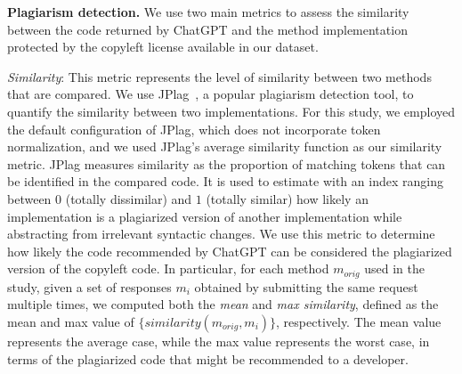 
\textbf{Plagiarism detection.} %
We use two main metrics to assess the similarity between the code returned by ChatGPT and the method implementation protected by the copyleft license available in our dataset.

    \emph{Similarity}: This metric represents the level of similarity between two methods that are compared. We use  JPlag~\cite{jplag}, a popular plagiarism detection tool, to quantify the similarity between two implementations. For this study, we employed the default configuration of JPlag, which does not incorporate token normalization, and we used JPlag's average similarity function as our similarity metric. JPlag measures similarity as the proportion of matching tokens that can be identified in the compared code. It is used to estimate with an index ranging between $0$ (totally dissimilar) and $1$ (totally similar) how likely an implementation is a plagiarized version of another implementation while abstracting from irrelevant syntactic changes. We use this metric to determine how likely the code recommended by ChatGPT can be considered the plagiarized version of the copyleft code.  In particular, for each method $m_{orig}$ used in the study, given a set of responses $m_i$ obtained by submitting the same request multiple times, we computed both the \emph{mean} and \emph{max similarity}, defined as the mean and max value of  $\{ \textit{similarity}(m_{orig}, m_i) \}$, respectively. The mean value represents the average case, while the max value represents the worst case, in terms of the plagiarized code that might be recommended to a developer. 
    
